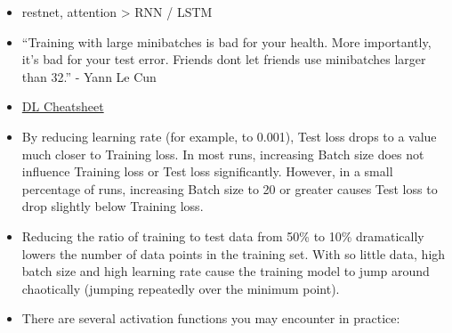 \documentclass[]{book}
\begin{document}
\begin{itemize}
\item
  restnet, attention \textgreater{} RNN / LSTM
\item
  ``Training with large minibatches is bad for your health. More
  importantly, it's bad for your test error. Friends dont let friends
  use minibatches larger than 32.'' - Yann Le Cun
\item
  \href{https://hackernoon.com/deep-learning-cheat-sheet-25421411e460}{DL
  Cheatsheet}
\item
  By reducing learning rate (for example, to 0.001), Test loss drops to
  a value much closer to Training loss. In most runs, increasing Batch
  size does not influence Training loss or Test loss significantly.
  However, in a small percentage of runs, increasing Batch size to 20 or
  greater causes Test loss to drop slightly below Training loss.
\item
  Reducing the ratio of training to test data from 50\% to 10\%
  dramatically lowers the number of data points in the training set.
  With so little data, high batch size and high learning rate cause the
  training model to jump around chaotically (jumping repeatedly over the
  minimum point).
\item
  There are several activation functions you may encounter in practice:


\end{itemize}
\end{document}
